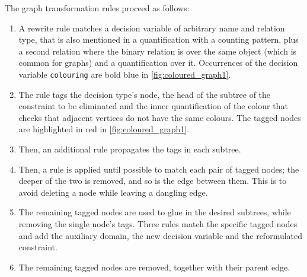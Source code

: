 \documentclass[a4paper,UKenglish,cleveref,pdfa]{lipics-v2021}
\newcommand{\zap}[1]{}
\newcommand{\code}[1]{{\small\texttt{{#1}}}}
\begin{document}
\zap{After further evaluations of the specification it was noted that as the number of colours for each vertex is the same for all vertices, the colours assigned to each vertex could be expressed as a set of fixed size. The decision variable, originally a relation, was then substituted by a function that maps each node to its set of colours. This allowed simplifying the two constraints into one constraint, leading to a more compact class model.
Moreover, the second specification performs vastly better than the first. It has therefore been chosen as an ideal case study for our method that aims to produce general rules that automatically rewrite one model into the other.
}
The graph transformation rules proceed as follows:
\begin{enumerate}
    \item A rewrite rule matches a decision variable of arbitrary name and relation type, that is also mentioned in a quantification with a counting pattern, plus a second relation where the binary relation is over the same object (which is common for graphs) and a quantification over it.
    Occurrences of the decision variable \code{colouring} are bold blue in \cref{fig:coloured_graph1}.
    \item The rule tags the decision type's node, the head of the subtree of the constraint to be eliminated and the inner quantification of the colour that checks that adjacent vertices do not have the same colours.
    The tagged nodes are highlighted in red in \cref{fig:coloured_graph1}.
    \item Then, an additional rule propagates the tags in each subtree. 
    \item Then, a rule is applied until possible to match each pair of tagged nodes; the deeper of the two is removed, and so is the edge between them. This is to avoid deleting a node while leaving a dangling edge.
    \item The remaining tagged nodes are used to glue in the desired subtrees, while removing the single node's tags. Three rules match the specific tagged nodes and add the auxiliary domain, the new decision variable and the reformulated constraint.
    \item The remaining tagged nodes are removed, together with their parent edge.
\end{enumerate}
\end{document}
